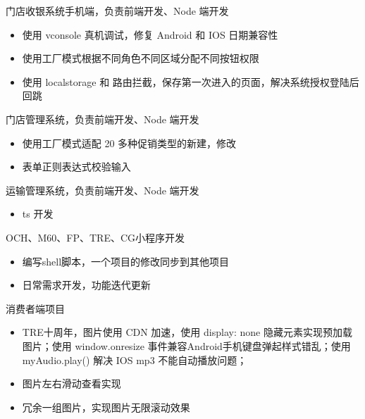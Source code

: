 \documentclass{resume}
\begin{document}
\begin{onehalfspacing}
门店收银系统手机端，负责前端开发、Node 端开发
\begin{itemize}
  \item 使用 vconsole 真机调试，修复 Android 和 IOS 日期兼容性
  \item 使用工厂模式根据不同角色不同区域分配不同按钮权限
  \item 使用 localstorage 和 路由拦截，保存第一次进入的页面，解决系统授权登陆后回跳
\end{itemize}
\end{onehalfspacing}

\begin{onehalfspacing}
门店管理系统，负责前端开发、Node 端开发
\begin{itemize}
  \item 使用工厂模式适配 20 多种促销类型的新建，修改
  \item 表单正则表达式校验输入
\end{itemize}
\end{onehalfspacing}

\begin{onehalfspacing}
运输管理系统，负责前端开发、Node 端开发
\begin{itemize}
  \item ts 开发
\end{itemize}
\end{onehalfspacing}

\begin{onehalfspacing}
OCH、M60、FP、TRE、CG小程序开发
\begin{itemize}
  \item 编写shell脚本，一个项目的修改同步到其他项目
  \item 日常需求开发，功能迭代更新
\end{itemize}
\end{onehalfspacing}

\newpage

\begin{onehalfspacing}
消费者端项目
\begin{itemize}
  \item TRE十周年，图片使用 CDN 加速，使用 display: none 隐藏元素实现预加载图片；使用 window.onresize 事件兼容Android手机键盘弹起样式错乱；使用 myAudio.play() 解决 IOS mp3 不能自动播放问题；
  \item 图片左右滑动查看实现
  \item 冗余一组图片，实现图片无限滚动效果
\end{itemize}
\end{onehalfspacing}
\end{document}
